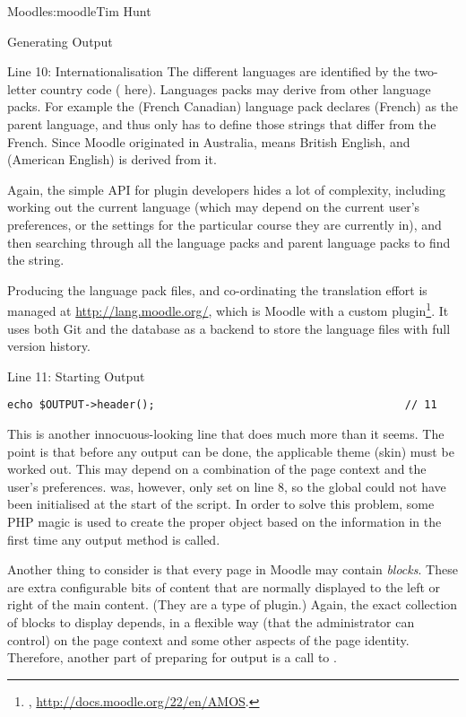 \begin{aosachapter}{Moodle}{s:moodle}{Tim Hunt}
\begin{aosasect1}{Generating Output}
\begin{aosasect2}{Line 10: Internationalisation}
The different languages are identified by the two-letter country code
( here). Languages packs may derive from other language
packs. For example the  (French Canadian) language pack
declares  (French) as the parent language, and thus only has
to define those strings that differ from the French. Since Moodle
originated in Australia,  means British English, and
 (American English) is derived from it.

Again, the simple  API for plugin developers hides a
lot of complexity, including working out the current language (which
may depend on the current user's preferences, or the settings for the
particular course they are currently in), and then searching through
all the language packs and parent language packs to find the string.

Producing the language pack files, and co-ordinating the translation
effort is managed at \url{http://lang.moodle.org/}, which is Moodle
with a custom plugin\footnote{,
  \url{http://docs.moodle.org/22/en/AMOS}.}. It uses both Git and the
database as a backend to store the language files with full version
history.

\end{aosasect2}

\begin{aosasect2}{Line 11: Starting Output}

\begin{verbatim}
echo $OUTPUT->header();                                       // 11
\end{verbatim}

This is another innocuous-looking line that does much more than it
seems. The point is that before any output can be done, the applicable
theme (skin) must be worked out. This may depend on a
combination of the page context and the user's
preferences.  was, however, only
set on line 8, so the  global could not have been initialised at the start of the script. In order to solve this problem, some PHP magic is used
to create the proper  object based on the information in  the first time any output method is called.

Another thing to consider is that every page in Moodle may
contain \emph{blocks}. These are extra configurable bits of content
that are normally displayed to the left or right of the main content. (They are a type of plugin.) Again, the
exact collection of blocks to display depends, in a flexible way (that
the administrator can control) on the page context and some other
aspects of the page identity. Therefore, another part of preparing for
output is a call to
.


\end{aosasect2}
\end{aosasect1}
\end{aosachapter}
